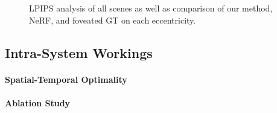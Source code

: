 \begin{figure}
    \centering
    \label{fig:lpips:gas}
    
    \caption{LPIPS analysis of all scenes as well as comparison of our method, NeRF, and foveated GT on each eccentricity.}
    {}
    \label{fig:lpips}
\end{figure}

\subsection{Intra-System Workings}
\label{sec:study:intra}
\paragraph{Spatial-Temporal Optimality}



\paragraph{Ablation Study}

